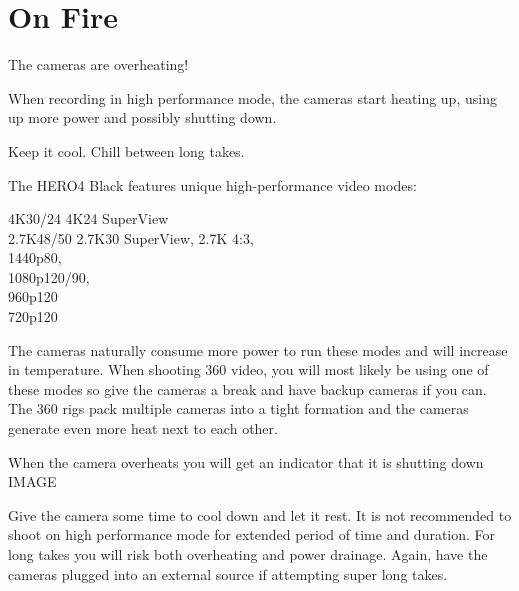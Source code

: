 \chapter{On Fire}
\pagecolor{white}
\label{chap:19}
\begin{fullwidth}


\problem

{\large The cameras are overheating!


 \par}

When recording in high performance mode, the cameras start heating up, using up more power and possibly shutting down. 


\solution

{\large Keep it cool. Chill between long takes. 


 \par}

The HERO4 Black features unique high-performance video modes: 

4K30/24 4K24 SuperView
\\
2.7K48/50 2.7K30 SuperView, 2.7K 4:3, 
\\
1440p80, 
\\
1080p120/90, 
\\
960p120 
\\
720p120

The cameras naturally consume more power to run these modes and will increase in temperature. When shooting 360 video, you will most likely be using one of these modes so give the cameras a break and have backup cameras if you can. The 360 rigs pack multiple cameras into a tight formation and the cameras generate even more heat next to each other. 

When the camera overheats you will get an indicator that it is shutting down
	      IMAGE
                 
Give the camera some time to cool down and let it rest. It is not recommended to shoot on high performance mode for extended period of time and duration. For long takes you will risk both overheating and power drainage. Again, have the cameras plugged into an external source if attempting super long takes. 






\clearpage
\end{fullwidth}
